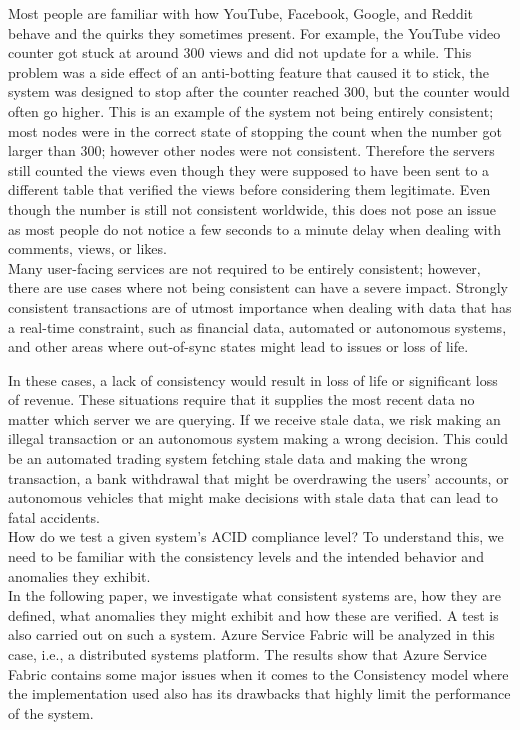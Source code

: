 \documentclass[a4paper,10pt,titlepage]{report}
\begin{document}
    Most people are familiar with how YouTube, Facebook, Google, and Reddit behave and the quirks they sometimes present.
    For example, the YouTube video counter got stuck at around 300 views and did not update for a while. This problem was a side effect of an anti-botting feature that caused it to stick, the system was designed to stop after the counter reached 300, but the counter would often go higher. This is an example of the system not being entirely consistent; most nodes were in the correct state of stopping the count when the number got larger than 300; however other nodes were not consistent. Therefore the servers still counted the views even though they were supposed to have been sent to a different table that verified the views before considering them legitimate. Even though the number is still not consistent worldwide, this does not pose an issue as most people do not notice a few seconds to a minute delay when dealing with comments, views, or likes.
    \\
    Many user-facing services are not required to be entirely consistent; however, there are use cases where not being consistent can have a severe impact. Strongly consistent transactions are of utmost importance when dealing with data that has a real-time constraint, such as financial data, automated or autonomous systems, and other areas where out-of-sync states might lead to issues or loss of life.

    In these cases, a lack of consistency would result in loss of life or significant loss of revenue. These situations require that it supplies the most recent data no matter which server we are querying. If we receive stale data, we risk making an illegal transaction or an autonomous system making a wrong decision. This could be an automated trading system fetching stale data and making the wrong transaction, a bank withdrawal that might be overdrawing the users' accounts, or autonomous vehicles that might make decisions with stale data that can lead to fatal accidents. \\

    \vspace{5mm}
    How do we test a given system's ACID compliance level? To understand this, we need to be familiar with the consistency levels and the intended behavior and anomalies they exhibit.\\
    \vspace{5mm}
    In the following paper, we investigate what consistent systems are, how they are defined, what anomalies they might exhibit and how these are verified. A test is also carried out on such a system. Azure Service Fabric will be analyzed in this case, i.e., a distributed systems platform. The results show that Azure Service Fabric contains some major issues when it comes to the Consistency model where the implementation used also has its drawbacks that highly limit the performance of the system.\\
    \vspace{5mm}
    \newpage
\end{document}

